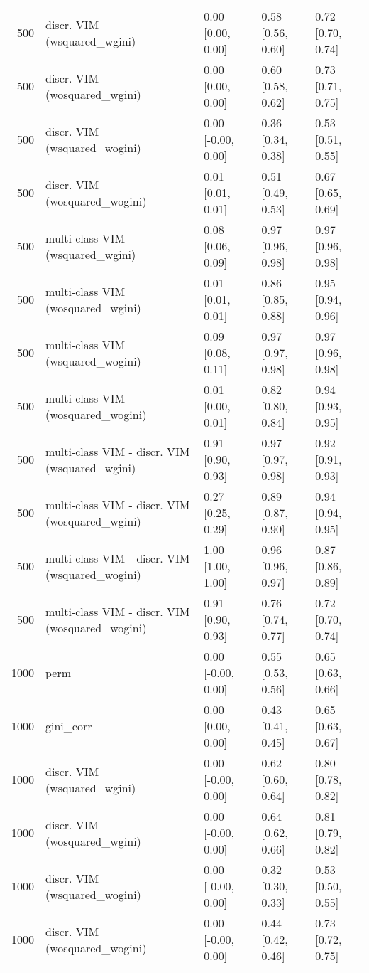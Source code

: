 \begin{table}[ht]
\begin{tabular}{rllll}
  500 & discr. VIM (wsquared\_wgini) & 0.00 [0.00, 0.00] & 0.58 [0.56, 0.60] & 0.72 [0.70, 0.74] \\ 
  500 & discr. VIM (wosquared\_wgini) & 0.00 [0.00, 0.00] & 0.60 [0.58, 0.62] & 0.73 [0.71, 0.75] \\ 
  500 & discr. VIM (wsquared\_wogini) & 0.00 [-0.00, 0.00] & 0.36 [0.34, 0.38] & 0.53 [0.51, 0.55] \\ 
  500 & discr. VIM (wosquared\_wogini) & 0.01 [0.01, 0.01] & 0.51 [0.49, 0.53] & 0.67 [0.65, 0.69] \\ 
  500 & multi-class VIM (wsquared\_wgini) & 0.08 [0.06, 0.09] & 0.97 [0.96, 0.98] & 0.97 [0.96, 0.98] \\ 
  500 & multi-class VIM (wosquared\_wgini) & 0.01 [0.01, 0.01] & 0.86 [0.85, 0.88] & 0.95 [0.94, 0.96] \\ 
  500 & multi-class VIM (wsquared\_wogini) & 0.09 [0.08, 0.11] & 0.97 [0.97, 0.98] & 0.97 [0.96, 0.98] \\ 
  500 & multi-class VIM (wosquared\_wogini) & 0.01 [0.00, 0.01] & 0.82 [0.80, 0.84] & 0.94 [0.93, 0.95] \\ 
  500 & multi-class VIM - discr. VIM (wsquared\_wgini) & 0.91 [0.90, 0.93] & 0.97 [0.97, 0.98] & 0.92 [0.91, 0.93] \\ 
  500 & multi-class VIM - discr. VIM (wosquared\_wgini) & 0.27 [0.25, 0.29] & 0.89 [0.87, 0.90] & 0.94 [0.94, 0.95] \\ 
  500 & multi-class VIM - discr. VIM (wsquared\_wogini) & 1.00 [1.00, 1.00] & 0.96 [0.96, 0.97] & 0.87 [0.86, 0.89] \\ 
  500 & multi-class VIM - discr. VIM (wosquared\_wogini) & 0.91 [0.90, 0.93] & 0.76 [0.74, 0.77] & 0.72 [0.70, 0.74] \\ 
   \hline 1000 & perm & 0.00 [-0.00, 0.00] & 0.55 [0.53, 0.56] & 0.65 [0.63, 0.66] \\ 
  1000 & gini\_corr & 0.00 [0.00, 0.00] & 0.43 [0.41, 0.45] & 0.65 [0.63, 0.67] \\ 
  1000 & discr. VIM (wsquared\_wgini) & 0.00 [-0.00, 0.00] & 0.62 [0.60, 0.64] & 0.80 [0.78, 0.82] \\ 
  1000 & discr. VIM (wosquared\_wgini) & 0.00 [-0.00, 0.00] & 0.64 [0.62, 0.66] & 0.81 [0.79, 0.82] \\ 
  1000 & discr. VIM (wsquared\_wogini) & 0.00 [-0.00, 0.00] & 0.32 [0.30, 0.33] & 0.53 [0.50, 0.55] \\ 
  1000 & discr. VIM (wosquared\_wogini) & 0.00 [-0.00, 0.00] & 0.44 [0.42, 0.46] & 0.73 [0.72, 0.75] \\ 

\end{tabular}
\end{table}
